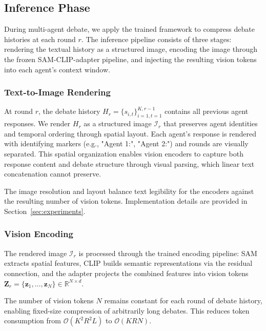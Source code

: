 \documentclass{article}
\theoremstyle{plain}
\theoremstyle{definition}
\theoremstyle{remark}
\begin{document}
\subsection{Inference Phase}
\label{subsec:inference}

During multi-agent debate, we apply the trained framework to compress debate histories 
at each round $r$. The inference pipeline consists of three stages: rendering the 
textual history as a structured image, encoding the image through the frozen 
SAM-CLIP-adapter pipeline, and injecting the resulting vision tokens into each 
agent's context window.

\subsubsection{Text-to-Image Rendering}
\label{subsubsec:text_rendering}

At round $r$, the debate history $H_r = \{s_{i,t}\}_{i=1,t=1}^{K,r-1}$ contains 
all previous agent responses. We render $H_r$ as a structured image $\mathcal{I}_r$ 
that preserves agent identities and temporal ordering through spatial layout. Each 
agent's response is rendered with identifying markers (e.g., "Agent 1:", "Agent 2:") 
and rounds are visually separated. This spatial organization enables vision encoders 
to capture both response content and debate structure through visual parsing, which 
linear text concatenation cannot preserve.

The image resolution and layout balance text legibility for the encoders against 
the resulting number of vision tokens. Implementation details are provided in 
Section~\ref{sec:experiments}.

\subsubsection{Vision Encoding}
\label{subsubsec:vision_encoding}

The rendered image $\mathcal{I}_r$ is processed through the trained encoding pipeline: 
SAM extracts spatial features, CLIP builds semantic representations via the residual 
connection, and the adapter projects the combined features into vision tokens 
$\mathbf{Z}_r = \{\mathbf{z}_1, \ldots, \mathbf{z}_N\} \in \mathbb{R}^{N \times d}$.

The number of vision tokens $N$ remains constant for each round of debate history, 
enabling fixed-size compression of arbitrarily long debates. This reduces token 
consumption from $\mathcal{O}(K^2 R^2 L)$ to $\mathcal{O}(K R N)$.
\end{document}
